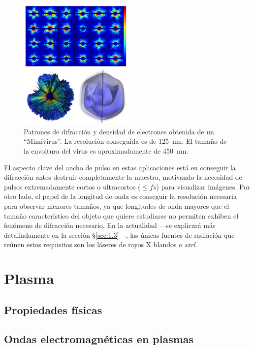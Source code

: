 \begin{figure}[ht!]
  \centering
  \includegraphics[width=0.5\textwidth]{Figuras/ch1_pulso.png}
  \caption{Patrones de difracción y densidad de electrones obtenida de un \enquote{Mimivirus}\autocite{Ekeberg2015}. La resolución conseguida es de \qty{125}{nm}. El tamaño de la envoltura del virus es aproximadamente de \qty{450}{nm}.}
  \label{fig:ch1_pulso}
\end{figure}

El aspecto clave del ancho de pulso en estas aplicaciones está en conseguir la difracción antes destruir completamente la muestra\autocite{Neutze2000}, motivando la necesidad de pulsos extremadamente cortos o ultracortos ($\le\unit{fs}$) para visualizar imágenes. Por otro lado, el papel de la longitud de onda es conseguir la resolución necesaria para observar menores tamaños, ya que longitudes de onda mayores que el tamaño característico del objeto que quiere estudiarse no permiten exhiben el fenómeno de difracción necesario. En la actualidad ---se explicará más detalladamente en la sección \S\ref{sec:1.3}---, las únicas fuentes de radiación que reúnen estos requisitos son los láseres de rayos X blandos o \emph{\acrfull{sxrl}}.

\section{Plasma}\label{sec:1.2}

\subsection{Propiedades físicas}\label{sec:1.2.1}

\subsection{Ondas electromagnéticas en plasmas}\label{sec:1.2.2}


